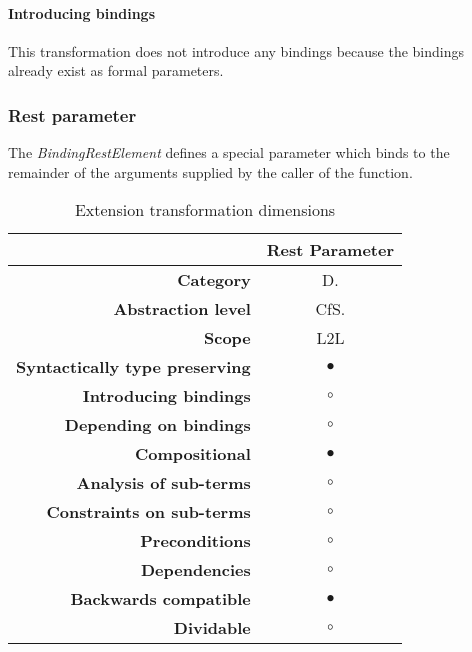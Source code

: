 \paragraph{Introducing bindings}
This transformation does not introduce any bindings because the bindings already exist as formal parameters.

\subsubsection{Rest parameter}
The \textit{BindingRestElement} defines a special parameter which binds to the remainder of the arguments supplied by the caller of the function.\cite[14.1]{SpecJS}

\begin{table}[h]
\centering
\caption{Extension transformation dimensions}
\label{rest-parameter-table}
\begin{tabular}{@{}rc@{}}
\toprule
                                       & \multicolumn{1}{l}{\textbf{Rest Parameter}} \\ \midrule
\textbf{Category}                      & D.
\\
\textbf{Abstraction level}          & CfS.                          \\
\textbf{Scope}                         & L2L                               \\
\textbf{Syntactically type preserving} & $\bullet$                                          \\
\textbf{Introducing bindings}          & $\circ$                                          \\%
\textbf{Depending on bindings}         & $\circ$                                           \\
\textbf{Compositional}                 & $\bullet$                                          \\
\textbf{Analysis of sub-terms}          & $\circ$                                          \\
\textbf{Constraints on sub-terms}       & $\circ$                                           \\
\textbf{Preconditions}                 & $\circ$                                          \\
\textbf{Dependencies}                  & $\circ$                                           \\
\textbf{Backwards compatible}          & $\bullet$                                          \\
\textbf{Dividable}                     & $\circ$                                           \\ \bottomrule
\end{tabular}
\end{table}

